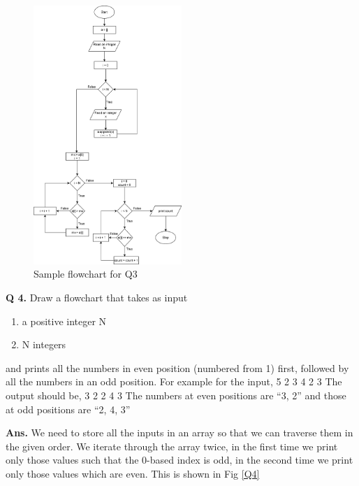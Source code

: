 \documentclass{article}
\begin{document}
    \begin{figure}[ht]
        \centering
        \includegraphics[width=0.5\textwidth]{Q3.png}
        \caption{Sample flowchart for Q3}
        \label{Q3}
    \end{figure}
    
    \clearpage


    \begin{flushleft}

        \textbf{Q 4. } Draw a flowchart that takes as input
        \begin{enumerate}
            \item a positive integer N
            \item N integers
        \end{enumerate}
    and prints all the numbers in even position (numbered from 1) first, followed by all the numbers in an odd position.
    For example for the input,
        5
    2 3 4 2 3 
    The output should be,
        3 2 2 4 3
    The numbers at even positions are “3, 2” and those at odd positions are “2, 4, 3”
    
        
        \end{flushleft}
        
        \begin{flushleft}
        
        \textbf{Ans. } We need to store all the inputs in an array so that we can traverse them in the 
        given order. We iterate through the array twice, in the first time we print only those values such 
        that the 0-based index is odd, in the second time we print only those values which are even.
        This is shown in Fig \ref{Q4}
        
        \end{flushleft}
        
\end{document}
